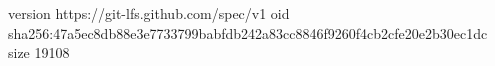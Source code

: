 version https://git-lfs.github.com/spec/v1
oid sha256:47a5ec8db88e3e7733799babfdb242a83cc8846f9260f4cb2cfe20e2b30ec1dc
size 19108
